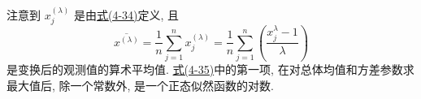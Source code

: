 注意到 $x_j^{(\lambda)}$ 是由\hyperref[eq:4-34]{式(4-34)}定义, 且
\label{eq:4-36}
\begin{equation}
\overline{x^{(\lambda)}} = \frac{1}{n}\sum_{j=1}^{n} x_j^{(\lambda)} = \frac{1}{n}\sum_{j=1}^{n}\left(\frac{x_j^\lambda - 1}{\lambda}\right) \tag{4-36}
\end{equation}
是变换后的观测值的算术平均值. \hyperref[eq:4-35]{式(4-35)}中的第一项, 在对总体均值和方差参数求最大值后, 除一个常数外, 是一个正态似然函数的对数.
